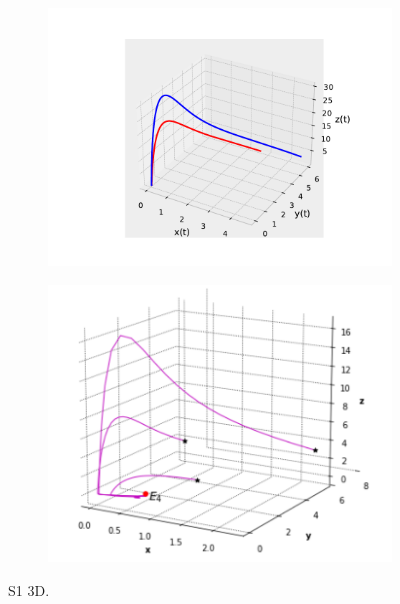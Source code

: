 \documentclass{wscpaperproc}
\theoremstyle{wsc}
\begin{document}
\begin{figure}[h]
	\centering
	\begin{subfigure}[b]{0.5\textwidth}
		\centering
		\includegraphics[width=\textwidth]{Simulations/S13d.pdf}
	
		\label{fig:comparativa3D1}
	\end{subfigure}%
	\begin{subfigure}[b]{0.5\textwidth}
		\centering
		\includegraphics[width=\textwidth]{GraficasPaper/S1[3d].png}
		\label{fig:comparativa3D12}
	\end{subfigure}
	\caption{S1 3D.}

	\label{fig:comparacion4}
\end{figure}
\end{document}
